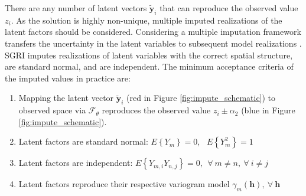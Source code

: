 There are any number of latent vectors $\tilde{\mathbf{y}}_{i}$ that can reproduce the observed value $z_{i}$. As the solution is highly non-unique, multiple imputed realizations of the latent factors should be considered. Considering a multiple imputation framework transfers the uncertainty in the latent variables to subsequent model realizations \citep{silva2017multiple}. \Gls{SGRI} imputes realizations of latent variables with the correct spatial structure, are standard normal, and are independent. The minimum acceptance criteria of the imputed values in practice are:

\begin{enumerate}[noitemsep]
    \item Mapping the latent vector $\tilde{\mathbf{y}}_{i}$ (red in Figure \ref{fig:impute_schematic}) to observed space via $\mathcal{F}_{\theta}$  reproduces the observed value $z_{i} \pm \alpha_{2}$ (blue in Figure \ref{fig:impute_schematic}).
    \item Latent factors are standard normal: $E\left\{Y_{m}\right\}=0$, \ $E\left\{Y_{m}^{2}\right\}=1$
    \item Latent factors are independent: $E\left\{Y_{m,i}Y_{n,j}\right\}=0, \ \ \forall \ m\neq n, \ \forall \ i \neq j$
    \item Latent factors reproduce their respective variogram model $\gamma_m(\mathbf{h}), \ \forall \ \mathbf{h}$
\end{enumerate}

